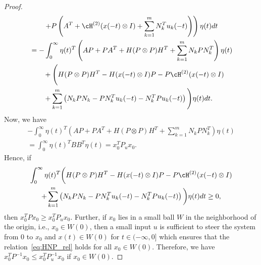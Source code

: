 \begin{proof}
\begin{align*}
 & \qquad \left. + P\left( A^T + \cH^{(2)}(x(-t)\otimes I) +\sum_{k=1}^mN_k^Tu_k(-t)\right) \right)\eta(t)dt \allowdisplaybreaks \\
  & =-\int_0^\infty  \eta(t)^T \left(AP + PA^T + H(P\otimes P)H^T + \sum_{k=1}^mN_kPN_k^T \right) \eta(t)  \\
  & \qquad+ \Bigg( H(P\otimes P)H^T - H(x(-t)\otimes I)P -P \cH^{(2)}(x(-t)\otimes I)   \\
 &\qquad    +  \sum_{k=1}^m\left(N_kPN_k -PN_k^Tu_k(-t) -N_k^TPu_k(-t) \right) \Bigg)\eta(t)dt.
 \end{align*}
Now, we have
\begin{multline*}
  -\int_0^\infty  \eta(t)^T \left(AP + PA^T + H(P\otimes P)H^T + \sum_{k=1}^mN_kPN_k^T \right) \eta(t) \\ =\int_0^\infty  \eta(t)^T  BB^T 
   \eta(t) = x_0^TP_ux_0.
\end{multline*}
Hence, if
\begin{multline}\label{eq:HNP_rel}
 \int_0^\infty \eta(t)^T \bigg( H(P\otimes P)H^T - H(x(-t)\otimes I)P -P \cH^{(2)}(x(-t)\otimes I)   \\
   +  \sum_{k=1}^m\left(N_kPN_k -PN_k^Tu_k(-t) -N_k^TPu_k(-t) \right) \bigg)\eta(t)dt \geq 0,
\end{multline}
then $x_0^TPx_0 \geq x_0^T P_ux_0$.
Further, if  $x_0$ lies in a small ball   $W$ in the neighborhood of  the origin, i.e., $x_0\in W(0)$, then a small input $u$  is sufficient to  steer the system from $0$ to $x_0$ and  $x(t) \in W(0) $ for $t \in (-\infty,0]$ which ensures that the relation~\eqref{eq:HNP_rel} holds for all $x_0 \in W(0)$.  Therefore, we have $x_0^TP^{-1}x_0 \leq x_0^T P_u^{-1}x_0$ if $x_0 \in W (0) $.
\end{proof}
